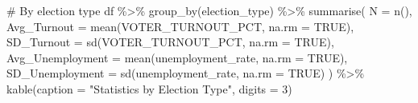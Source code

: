 \documentclass[
  11pt,
]{article}
\newenvironment{Shaded}{\begin{snugshade}}{\end{snugshade}}
\newcommand{\AttributeTok}[1]{\textcolor[rgb]{0.40,0.45,0.13}{#1}}
\newcommand{\CommentTok}[1]{\textcolor[rgb]{0.37,0.37,0.37}{#1}}
\newcommand{\ConstantTok}[1]{\textcolor[rgb]{0.56,0.35,0.01}{#1}}
\newcommand{\DecValTok}[1]{\textcolor[rgb]{0.68,0.00,0.00}{#1}}
\newcommand{\FunctionTok}[1]{\textcolor[rgb]{0.28,0.35,0.67}{#1}}
\newcommand{\NormalTok}[1]{\textcolor[rgb]{0.00,0.23,0.31}{#1}}
\newcommand{\SpecialCharTok}[1]{\textcolor[rgb]{0.37,0.37,0.37}{#1}}
\newcommand{\StringTok}[1]{\textcolor[rgb]{0.13,0.47,0.30}{#1}}
\begin{document}
\begin{Shaded}
\begin{Highlighting}[]
\CommentTok{\# By election type}
\NormalTok{df }\SpecialCharTok{\%\textgreater{}\%}
  \FunctionTok{group\_by}\NormalTok{(election\_type) }\SpecialCharTok{\%\textgreater{}\%}
  \FunctionTok{summarise}\NormalTok{(}
    \AttributeTok{N =} \FunctionTok{n}\NormalTok{(),}
    \AttributeTok{Avg\_Turnout =} \FunctionTok{mean}\NormalTok{(VOTER\_TURNOUT\_PCT, }\AttributeTok{na.rm =} \ConstantTok{TRUE}\NormalTok{),}
    \AttributeTok{SD\_Turnout =} \FunctionTok{sd}\NormalTok{(VOTER\_TURNOUT\_PCT, }\AttributeTok{na.rm =} \ConstantTok{TRUE}\NormalTok{),}
    \AttributeTok{Avg\_Unemployment =} \FunctionTok{mean}\NormalTok{(unemployment\_rate, }\AttributeTok{na.rm =} \ConstantTok{TRUE}\NormalTok{),}
    \AttributeTok{SD\_Unemployment =} \FunctionTok{sd}\NormalTok{(unemployment\_rate, }\AttributeTok{na.rm =} \ConstantTok{TRUE}\NormalTok{)}
\NormalTok{  ) }\SpecialCharTok{\%\textgreater{}\%}
  \FunctionTok{kable}\NormalTok{(}\AttributeTok{caption =} \StringTok{"Statistics by Election Type"}\NormalTok{, }\AttributeTok{digits =} \DecValTok{3}\NormalTok{)}
\end{Highlighting}
\end{Shaded}
\end{document}
